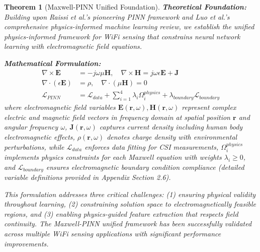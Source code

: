 \documentclass[journal]{IEEEtran}
\newtheorem{theorem}{Theorem}
\begin{document}
\begin{theorem}[Maxwell-PINN Unified Foundation]
\label{thm:maxwell_pinn}
\textbf{Theoretical Foundation:} Building upon Raissi et al.'s \cite{raissi2019physics} pioneering PINN framework and Luo et al.'s \cite{luo2025physics} comprehensive physics-informed machine learning review, we establish the unified physics-informed framework for WiFi sensing that constrains neural network learning with electromagnetic field equations.

\textbf{Mathematical Formulation:}
\begin{align}
\nabla \times \mathbf{E} &= -j\omega \mu \mathbf{H}, \quad \nabla \times \mathbf{H} = j\omega \epsilon \mathbf{E} + \mathbf{J} \label{eq:maxwell_equations} \\
\nabla \cdot (\epsilon \mathbf{E}) &= \rho, \quad \nabla \cdot (\mu \mathbf{H}) = 0 \label{eq:maxwell_divergence} \\
\mathcal{L}_{PINN} &= \mathcal{L}_{data} + \sum_{i=1}^{4} \lambda_i \Omega_i^{physics} + \lambda_{boundary} \mathcal{L}_{boundary} \label{eq:pinn_loss_complete}
\end{align}
where electromagnetic field variables $\mathbf{E}(\mathbf{r},\omega), \mathbf{H}(\mathbf{r},\omega)$ represent complex electric and magnetic field vectors in frequency domain at spatial position $\mathbf{r}$ and angular frequency $\omega$, $\mathbf{J}(\mathbf{r},\omega)$ captures current density including human body electromagnetic effects, $\rho(\mathbf{r},\omega)$ denotes charge density with environmental perturbations, while $\mathcal{L}_{data}$ enforces data fitting for CSI measurements, $\Omega_i^{physics}$ implements physics constraints for each Maxwell equation with weights $\lambda_i \geq 0$, and $\mathcal{L}_{boundary}$ ensures electromagnetic boundary condition compliance (detailed variable definitions provided in Appendix Section 2.6).

This formulation addresses three critical challenges: (1) ensuring physical validity throughout learning, (2) constraining solution space to electromagnetically feasible regions, and (3) enabling physics-guided feature extraction that respects field continuity. The Maxwell-PINN unified framework has been successfully validated across multiple WiFi sensing applications with significant performance improvements.


\end{theorem}
\end{document}
